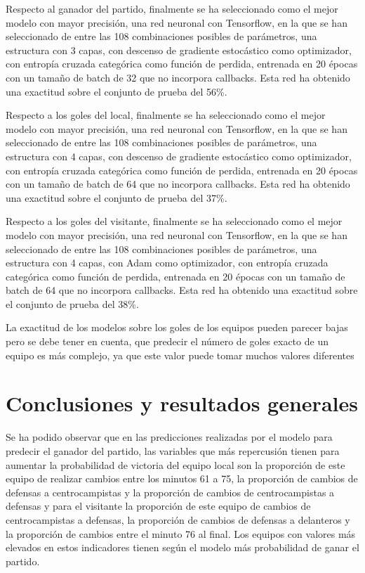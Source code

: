 Respecto al ganador del partido, finalmente se ha seleccionado como el mejor modelo con mayor 
precisión, una red neuronal con Tensorflow, en la que se han seleccionado de entre las 108 
combinaciones posibles de parámetros, una estructura con 3 capas, con descenso de gradiente 
estocástico como optimizador, con entropía cruzada categórica como función de perdida, 
entrenada en 20 épocas con un tamaño de batch de 32 que no incorpora callbacks. Esta red ha 
obtenido una exactitud sobre el conjunto de prueba del 56\%.

Respecto a los goles del local, finalmente se ha seleccionado como el mejor modelo con mayor 
precisión, una red neuronal con Tensorflow, en la que se han seleccionado de entre las 108 
combinaciones posibles de parámetros, una estructura con 4 capas, con descenso de gradiente 
estocástico como optimizador, con entropía cruzada categórica como función de perdida, 
entrenada en 20 épocas con un tamaño de batch de 64 que no incorpora callbacks. Esta red ha 
obtenido una exactitud sobre el conjunto de prueba del 37\%.

Respecto a los goles del visitante, finalmente se ha seleccionado como el mejor modelo con mayor 
precisión, una red neuronal con Tensorflow, en la que se han seleccionado de entre las 108 
combinaciones posibles de parámetros, una estructura con 4 capas, con Adam como optimizador, 
con entropía cruzada categórica como función de perdida, entrenada en 20 épocas con un tamaño 
de batch de 64 que no incorpora callbacks. Esta red ha obtenido una exactitud sobre el conjunto 
de prueba del 38\%.

La exactitud de los modelos sobre los goles de los equipos pueden parecer bajas pero se debe 
tener en cuenta, que predecir el número de goles exacto de un equipo es más complejo, ya que 
este valor puede tomar muchos valores diferentes



\section{Conclusiones y resultados generales}
Se ha podido observar que en las predicciones realizadas por el modelo para predecir el ganador 
del partido, las variables que más repercusión tienen para aumentar la probabilidad de victoria del
equipo local son la proporción de este equipo de realizar cambios entre los minutos 61 a 75, la
proporción de cambios de defensas a centrocampistas y la proporción de cambios de
centrocampistas a defensas y para el visitante la proporción de este equipo de cambios de
centrocampistas a defensas, la proporción de cambios de defensas a delanteros y la proporción de 
cambios entre el minuto 76 al final. Los equipos con valores más elevados en estos indicadores 
tienen según el modelo más probabilidad de ganar el partido.

